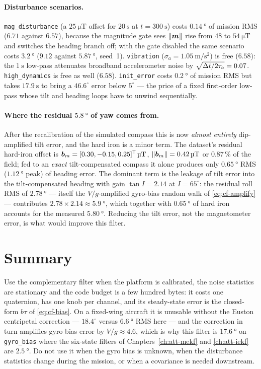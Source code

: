 \paragraph{Disturbance scenarios.} \texttt{mag\_disturbance} (a $\SI{25}{\micro\tesla}$ offset for
$\SI{20}{\second}$ at $t=\SI{300}{\second}$) costs $\SI{0.14}{\degree}$ of mission RMS
($6.71$ against $6.57$), because the magnitude gate sees $\left\lVert \bm{m} \right\rVert$ rise from $48$ to
$\SI{54}{\micro\tesla}$ and switches the heading branch off; with the gate disabled the same
scenario costs $\SI{3.2}{\degree}$ ($9.12$ against $\SI{5.87}{\degree}$, seed~1).
\texttt{vibration} ($\sigma_a=\SI{1.05}{\metre\per\second\squared}$) is free ($6.58$): the
$\SI{1}{\second}$ low-pass attenuates broadband accelerometer noise by
$\sqrt{\Delta t/2\tau_a}=0.07$. \texttt{high\_dynamics} is free as well ($6.58$).
\texttt{init\_error} costs $\SI{0.2}{\degree}$ of mission RMS but takes $\SI{17.9}{\second}$ to
bring a $46.6^\circ$ error below $5^\circ$ --- the price of a fixed first-order low-pass whose tilt
and heading loops have to unwind sequentially.

\paragraph{Where the residual $\SI{5.8}{\degree}$ of yaw comes from.} After the recalibration of the
simulated compass this is now \emph{almost entirely} dip-amplified tilt error, and the hard iron is
a minor term. The dataset's residual hard-iron offset is
$\bm{b}_m=[0.30,-0.15,0.25]^{\mathsf{T}}\,\SI{}{\micro\tesla}$, $\left\lVert \bm{b}_m \right\rVert=\SI{0.42}{\micro\tesla}$ or
$0.87\,\%$ of the field; fed to an \emph{exact} tilt-compensated compass it alone produces only
$\SI{0.65}{\degree}$ RMS ($\SI{1.12}{\degree}$ peak) of heading error. The dominant term is the
leakage of tilt error into the tilt-compensated heading with gain $\tan I = 2.14$ at $I=65^\circ$:
the residual roll RMS of $\SI{2.78}{\degree}$ --- itself the $V/g$-amplified gyro-bias random walk
of \eqref{eq:cf-amplify} --- contributes $2.78\times2.14\approx\SI{5.9}{\degree}$, which together
with $\SI{0.65}{\degree}$ of hard iron accounts for the measured $\SI{5.80}{\degree}$. Reducing the
tilt error, not the magnetometer error, is what would improve this filter.

\section{Summary}
Use the complementary filter when the platform is calibrated, the noise statistics are stationary
and the code budget is a few hundred bytes: it costs one quaternion, has one knob per channel, and
its steady-state error is the closed-form $b\tau$ of \eqref{eq:cf-bias}. On a fixed-wing aircraft
it is unusable without the Euston centripetal correction --- $18.4^\circ$ versus $\SI{6.6}{\degree}$
RMS here --- and the correction in turn amplifies gyro-bias error by $V/g\approx4.6$, which is why
this filter is $\SI{17.6}{\degree}$ on \texttt{gyro\_bias} where the six-state filters of
Chapters~\ref{ch:att-mekf} and \ref{ch:att-iekf} are $\SI{2.5}{\degree}$. Do not use it when the
gyro bias is unknown, when the disturbance statistics change during the mission, or when a
covariance is needed downstream.
